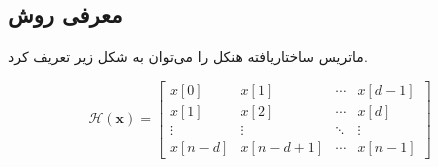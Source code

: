 \FloatBarrier
\subsection{معرفی روش }\label{ch:literature-review|sec:compressed-sensing|subsec:aloha}


ماتریس ساختاریافته هنکل
را می‌توان به شکل زیر تعریف کرد.

\removevspace
\begin{equation}\label{eq:HankelStructuredMatrix}
	\mathcal{H}(\mathbf{x})=
	\left[\begin{array}{cccc}
		x[0] & x[1] & \cdots & x[d-1] \\
		x[1] & x[2] & \cdots & x[d] \\
		\vdots & \vdots & \ddots & \vdots \\
		x[n-d] & x[n-d+1] & \cdots & x[n-1]
	\end{array}\right]
\end{equation}


